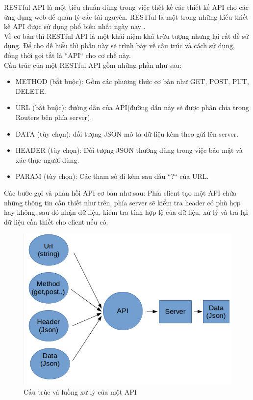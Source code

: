 RESTful API là một tiêu chuẩn dùng trong việc thết kế các thiết kế API cho các ứng dụng web để quản lý các tài nguyên. RESTful là một trong những kiểu thiết kế API được sử dụng phổ biến nhất ngày nay \cite{website:restfulapi}.\\
Về cơ bản thì RESTful API là một khái niệm khá trừu tượng nhưng lại rất dễ sử dụng. Để cho dễ hiểu thì phần này sẽ trình bày về cấu trúc và cách sử dụng, đồng thời gọi tắt là ``API`` cho cơ chế này.\\
Cấu trúc của một RESTful API gồm những phần như sau:
\begin{itemize}
    \item METHOD (bắt buộc): Gồm các phương thức cơ bản như GET, POST, PUT, DELETE.
    \item URL (bắt buộc): đường dẫn của API(đường dẫn này sẽ được phân chia trong Routers bên phía server).
    \item DATA (tùy chọn): đối tượng JSON mô tả dữ liệu kèm theo gửi lên server.
    \item HEADER (tùy chọn): Đối tượng JSON thường dùng trong việc bảo mật và xác thực người dùng.
    \item PARAM (tùy chọn): Các tham số đi kèm sau dấu ``?`` của URL.
\end{itemize}
Các bước gọi và phản hồi API cơ bản như sau:
Phía client tạo một API chứa những thông tin cần thiết như trên, phía server sẽ kiểm tra header có phù hợp hay không, sau đó nhận dữ liệu, kiểm tra tính hợp lệ của dữ liệu, xử lý và trả lại dữ liệu cần thiết cho client nếu có.
\begin{figure}[h]
\centering
    \includegraphics[totalheight=7cm]{Images/app_json.png}
    \caption{Cấu trúc và luồng xử lý của một API}
    \label{skip_conn}
\end{figure}
